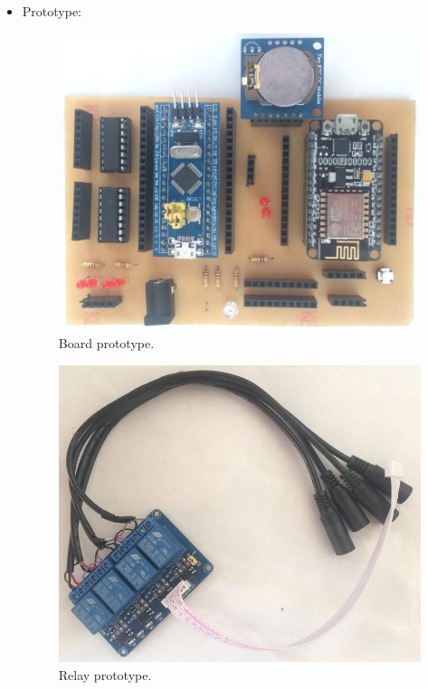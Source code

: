 \documentclass[a4paper,12pt,oneside]{article}
\begin{document}
\begin{itemize}
\item Prototype:
	\begin{figure}[H]
	\centering
	\includegraphics[scale=.15]{hinh/prototype_board.jpg}
	\caption{Board prototype.}
	\end{figure}
	
	\begin{figure}[H]
	\centering
	\includegraphics[scale=.5]{hinh/relay_prototype.jpg}
	\caption{Relay prototype.}
	\end{figure}
	

\end{itemize}
\end{document}
